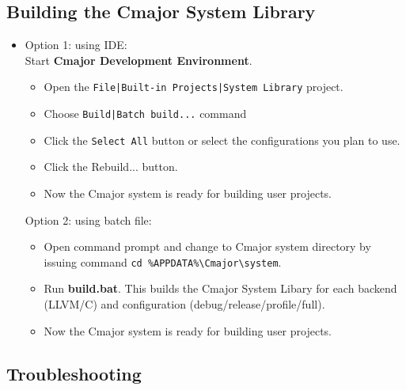 \documentclass[oneside, a4paper, 11pt]{article}
\begin{document}
\subsection{Building the Cmajor System Library}

\begin{itemize}

\item
Option 1: using IDE:\\

Start \textbf{Cmajor Development Environment}.

\begin{itemize}

\item
Open the \verb!File|Built-in Projects|System Library! project.

\item
Choose \verb!Build|Batch build...! command

\item
Click the \verb|Select All| button or
select the configurations you plan to use.

\item
Click the Rebuild... button.

\item
Now the Cmajor system is ready for building user projects.

\end{itemize}

Option 2: using batch file:

\begin{itemize}

\item
Open command prompt and change to Cmajor system directory by issuing command
\verb|cd %APPDATA%\Cmajor\system|.

\item
Run \textbf{build.bat}.
This builds the Cmajor System Libary for each backend (LLVM/C) and
configuration (debug/release/profile/full).

\item
Now the Cmajor system is ready for building user projects.

\end{itemize}

\end{itemize}

\subsection{Troubleshooting}
\end{document}
